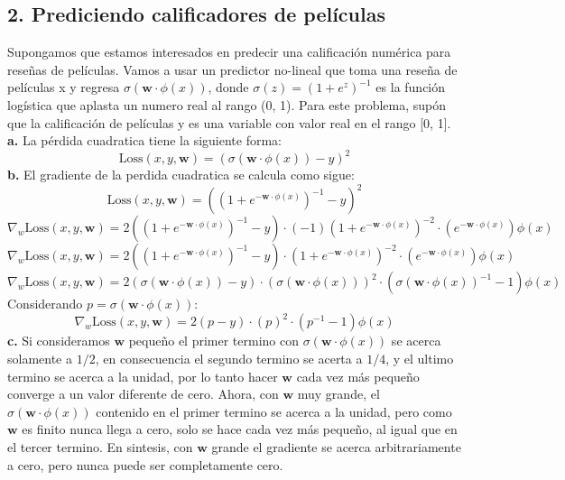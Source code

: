 \documentclass[14pt,a4paper]{report}
\begin{document}
\subsection*{2. Prediciendo calificadores de películas}
Supongamos que estamos interesados en predecir una calificación numérica para reseñas de películas. Vamos a usar un predictor no-lineal que toma una reseña de películas x y regresa $\sigma(\mathbf{w}\cdot\phi(x))$, donde $\sigma(z)=(1+e^{z})^{-1}$ es la función logística que aplasta un numero real al rango (0, 1). Para este problema, supón que la calificación de películas y es una variable con valor real en el
rango [0, 1].\\
\textbf{a.} La pérdida cuadratica tiene la siguiente forma:
\begin{equation*}
	\text{Loss}(x,y,\mathbf{w})=(\sigma(\mathbf{w}\cdot\phi(x))-y)^2
\end{equation*}
\textbf{b.} El gradiente de la perdida cuadratica se calcula como sigue:
\begin{equation*}
	\text{Loss}(x,y,\mathbf{w})=((1+e^{-\mathbf{w}\cdot\phi(x)})^{-1}-y)^2
\end{equation*}
\begin{equation*}
	\nabla_{w}\text{Loss}(x,y,\mathbf{w})=2((1+e^{-\mathbf{w}\cdot\phi(x)})^{-1}-y)\cdot(-1)(1+e^{-\mathbf{w}\cdot\phi(x)})^{-2}\cdot(e^{-\mathbf{w}\cdot\phi(x)})\phi(x)
\end{equation*}
\begin{equation*}
	\nabla_{w}\text{Loss}(x,y,\mathbf{w})=2((1+e^{-\mathbf{w}\cdot\phi(x)})^{-1}-y)\cdot(1+e^{-\mathbf{w}\cdot\phi(x)})^{-2}\cdot(e^{-\mathbf{w}\cdot\phi(x)})\phi(x)
\end{equation*}
\begin{equation*}
	\nabla_{w}\text{Loss}(x,y,\mathbf{w})=
	2(\sigma(\mathbf{w}\cdot\phi(x))-y)\cdot(\sigma(\mathbf{w}\cdot\phi(x)))^{2}\cdot(\sigma(\mathbf{w}\cdot\phi(x))^{-1}-1)\phi(x)
\end{equation*}
Considerando $p=\sigma(\mathbf{w}\cdot\phi(x))$:
\begin{equation*}
	\nabla_{w}\text{Loss}(x,y,\mathbf{w})=
	2(p-y)\cdot(p)^{2}\cdot(p^{-1}-1)\phi(x)
\end{equation*}
\textbf{c.} Si consideramos $\mathbf{w}$ pequeño el primer termino con $\sigma(\mathbf{w}\cdot\phi(x))$ se acerca solamente a $1/2$, en consecuencia el segundo termino se acerta a $1/4$, y el ultimo termino se acerca a la unidad, por lo tanto hacer $\mathbf{w}$ cada vez más pequeño converge a un valor diferente de cero. Ahora, con $\mathbf{w}$ muy grande, el $\sigma(\mathbf{w}\cdot\phi(x))$ contenido en el primer termino se acerca a la unidad, pero como $\mathbf{w}$ es finito nunca llega a cero, solo se hace cada vez más pequeño, al igual que en el tercer termino. En sintesis, con $\mathbf{w}$ grande el gradiente se acerca arbitrariamente a cero, pero nunca puede ser completamente cero.
\end{document}
